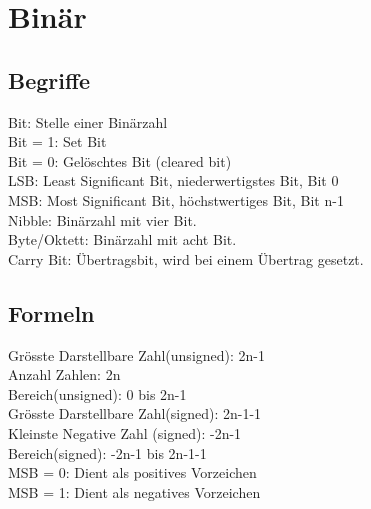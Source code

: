 \section{Binär}
\subsection{Begriffe}
\textcolor{myblue}{Bit}: Stelle einer Binärzahl\\
\textcolor{myblue}{Bit = 1}: Set Bit\\
\textcolor{myblue}{Bit = 0}: Gelöschtes Bit (cleared bit) \\
\textcolor{myblue}{LSB}: Least Significant Bit, niederwertigstes Bit, Bit 0\\
\textcolor{myblue}{MSB}: Most Significant Bit, höchstwertiges Bit, Bit n-1\\
\textcolor{myblue}{Nibble}: Binärzahl mit vier Bit.\\
\textcolor{myblue}{Byte/Oktett}: Binärzahl mit acht Bit.\\
\textcolor{myblue}{Carry Bit}: Übertragsbit, wird bei einem Übertrag gesetzt.\\

\subsection{Formeln}
\textcolor{myblue}{Grösste Darstellbare Zahl(unsigned)}: 2n-1 \\
\textcolor{myblue}{Anzahl Zahlen}: 2n \\
\textcolor{myblue}{Bereich(unsigned)}: 0 bis 2n-1 \\
\textcolor{myblue}{Grösste Darstellbare Zahl(signed)}: 2n-1-1 \\
\textcolor{myblue}{Kleinste Negative Zahl (signed)}: -2n-1 \\
\textcolor{myblue}{Bereich(signed)}: -2n-1 bis 2n-1-1 \\
\textcolor{myblue}{MSB = 0}: Dient als positives Vorzeichen \\
\textcolor{myblue}{MSB = 1}: Dient als negatives Vorzeichen 
